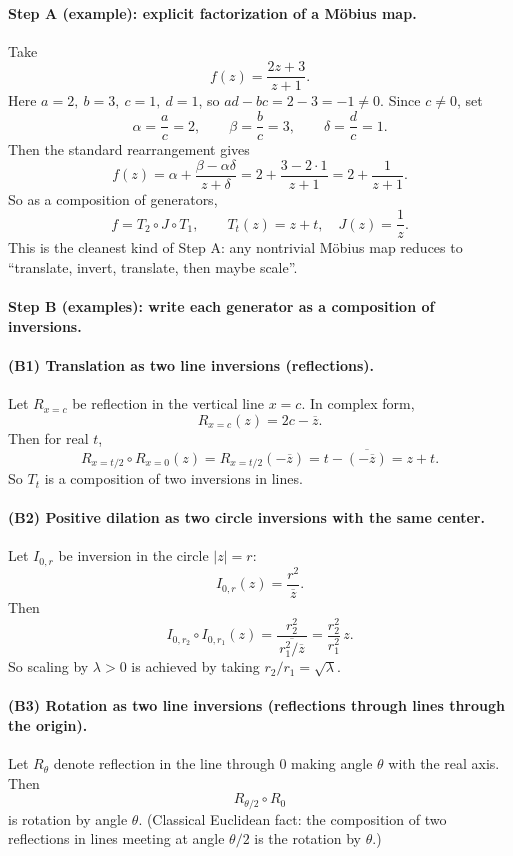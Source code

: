 \documentclass[12pt,a4paper]{article}
\theoremstyle{plain}
\theoremstyle{definition}      %
\begin{document}
\paragraph{\textbf{Step A (example): explicit factorization of a Möbius map.}}
Take
\[
f(z)=\frac{2z+3}{z+1}.
\]
Here $a=2,\ b=3,\ c=1,\ d=1$, so $ad-bc=2-3=-1\neq 0$. Since $c\neq 0$, set
\[
\alpha=\frac ac=2,\qquad \beta=\frac bc=3,\qquad \delta=\frac dc=1.
\]
Then the standard rearrangement gives
\[
f(z)=\alpha+\frac{\beta-\alpha\delta}{z+\delta}
=2+\frac{3-2\cdot 1}{z+1}
=2+\frac{1}{z+1}.
\]
So as a composition of generators,
\[
f = T_{2}\circ J \circ T_{1},
\qquad
T_{t}(z)=z+t,\quad J(z)=\frac1z.
\]
This is the cleanest kind of Step A: any nontrivial Möbius map reduces to “translate, invert, translate, then maybe scale”.

\medskip
\paragraph{\textbf{Step B (examples): write each generator as a composition of inversions.}}

\paragraph{\textbf{(B1) Translation as two line inversions (reflections).}}
Let $R_{x=c}$ be reflection in the vertical line $x=c$. In complex form,
\[
R_{x=c}(z)=2c-\overline{z}.
\]
Then for real $t$,
\[
R_{x=t/2}\circ R_{x=0}(z) = R_{x=t/2}(-\overline{z}) = t-\overline{(-\overline{z})}=z+t.
\]
So $T_t$ is a composition of two inversions in lines.

\paragraph{\textbf{(B2) Positive dilation as two circle inversions with the same center.}}
Let $I_{0,r}$ be inversion in the circle $|z|=r$:
\[
I_{0,r}(z)=\frac{r^{2}}{\overline{z}}.
\]
Then
\[
I_{0,r_2}\circ I_{0,r_1}(z)
=\frac{r_2^2}{\overline{\,r_1^2/\overline{z}\,}}
=\frac{r_2^2}{r_1^2}\,z.
\]
So scaling by $\lambda>0$ is achieved by taking $r_2/r_1=\sqrt{\lambda}$.

\paragraph{\textbf{(B3) Rotation as two line inversions (reflections through lines through the origin).}}
Let $R_{\theta}$ denote reflection in the line through $0$ making angle $\theta$ with the real axis. Then
\[
R_{\theta/2}\circ R_{0}
\]
is rotation by angle $\theta$. (Classical Euclidean fact: the composition of two reflections in lines meeting at angle $\theta/2$ is the rotation by $\theta$.)
\end{document}
